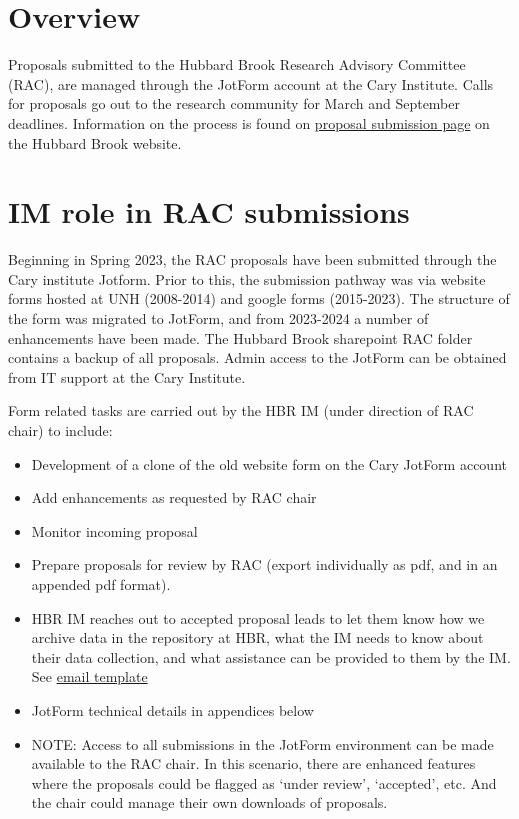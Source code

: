\documentclass[
  letterpaper,
  DIV=11,
  numbers=noendperiod]{scrreprt}
\begin{document}
\section{Overview}\label{overview-6}

Proposals submitted to the Hubbard Brook Research Advisory Committee
(RAC), are managed through the JotForm account at the Cary Institute.
Calls for proposals go out to the research community for March and
September deadlines. Information on the process is found on
\href{https://hubbardbrook.org/research-proposal-submission/}{proposal
submission page} on the Hubbard Brook website.

\section{IM role in RAC submissions}\label{im-role-in-rac-submissions}

Beginning in Spring 2023, the RAC proposals have been submitted through
the Cary institute Jotform. Prior to this, the submission pathway was
via website forms hosted at UNH (2008-2014) and google forms
(2015-2023). The structure of the form was migrated to JotForm, and from
2023-2024 a number of enhancements have been made. The Hubbard Brook
sharepoint RAC folder contains a backup of all proposals. Admin access
to the JotForm can be obtained from IT support at the Cary Institute.

Form related tasks are carried out by the HBR IM (under direction of RAC
chair) to include:

\begin{itemize}
\item
  Development of a clone of the old website form on the Cary JotForm
  account
\item
  Add enhancements as requested by RAC chair
\item
  Monitor incoming proposal
\item
  Prepare proposals for review by RAC (export individually as pdf, and
  in an appended pdf format).
\item
  HBR IM reaches out to accepted proposal leads to let them know how we
  archive data in the repository at HBR, what the IM needs to know about
  their data collection, and what assistance can be provided to them by
  the IM. See \href{TBD}{email template}
\item
  JotForm technical details in appendices below
\item
  NOTE: Access to all submissions in the JotForm environment can be made
  available to the RAC chair. In this scenario, there are enhanced
  features where the proposals could be flagged as `under review',
  `accepted', etc. And the chair could manage their own downloads of
  proposals.
\end{itemize}
\end{document}
